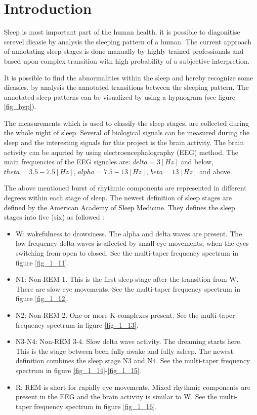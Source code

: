 \section{Introduction}
\label{sec:intro}

Sleep is most important part of the human health. it is possible to diagonitise serevel dieasie by analysis the sleeping pattern of a human. 
The current approach of annotating sleep stages is done manually by highly trained professionals and based upon complex transition with high probability of a subjective interpretion.

It is possible to find the abnormalities within the sleep and hereby recognize some dieasies, by analysis the annotated transitions between the sleeping pattern. The annotated sleep patterns can be visualized by using a hypnogram (see figure \ref{fig_hyp}).

The measurements which is used to classify the sleep stages, are collected during the whole night  of sleep. Several of biological signals can be measured during the sleep and the interesting signals for this project is the brain activity. The brain activity can be aquried by using electroencephalography (EEG) method. 
The main frequencies of the EEG signales are: $delta= 3 \left[ Hz \right]$ and below, 
$theta= 3.5-7.5 \left[ Hz \right]$,
$alpha= 7.5-13 \left[ Hz \right]$, 
$beta= 13 \left[ Hz \right]$ and above.

The above mentioned burst of rhythmic components are represented in different degrees within each stage of sleep.   
The newest definition of sleep stages are defined by the American Academy of Sleep Medicine. They defines the sleep stages into five (six) as followed \cite{main_ar,AASM}: 
\begin{itemize}
\item W: wakefulness to drowsiness. The alpha and delta waves are present. The low frequency delta waves is affected by small eye movements, when the eyes switching from open to closed. See the multi-taper frequency spectrum in figure \ref{fig_1_11}.
\item N1: Non-REM 1. This is the first sleep stage after the transition from W. There are slow eye movements, See the multi-taper frequency spectrum in figure \ref{fig_1_12}.
\item N2: Non-REM 2. One or more K-complexes present. See the multi-taper frequency spectrum in figure \ref{fig_1_13}.
\item N3-N4: Non-REM 3-4. Slow delta wave activity. The dreaming starts here. This is the stage between been fully awake and fully asleep. The newest definition combines the sleep stage N3 and N4. See the multi-taper frequency spectrum in figure \ref{fig_1_14}-\ref{fig_1_15}.
\item R: REM is short for rapidly eye movements. Mixed rhythmic components are present in the EEG and the brain activity is similar to W. See the multi-taper  frequency spectrum in figure \ref{fig_1_16}.
\end{itemize} 

